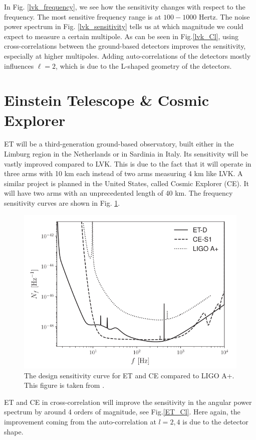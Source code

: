 In Fig. \ref{lvk_frequency}, we see how the sensitivity changes with respect to the frequency. The most sensitive frequency range is at $100 -1000$ Hertz.
The noise power spectrum in Fig. \ref{lvk_sensitivity} tells us at which magnitude we could expect to measure a certain multipole.
As can be seen in Fig.\ref{lvk_Cl}, using cross-correlations between the ground-based detectors improves the sensitivity, especially at higher multipoles. Adding auto-correlations of the detectors mostly influences $\ell=2$, which is due to the L-shaped geometry of the detectors. 

\section{Einstein Telescope \& Cosmic Explorer}

\label{ET_CE}

ET will be a third-generation ground-based observatory, built either in the Limburg region in the Netherlands or in Sardinia in Italy. Its sensitivity will be vastly improved compared to LVK. This is due to the fact that it will operate in three arms with 10 km each instead of two arms measuring 4 km like LVK. A similar project is planned in the United States, called Cosmic Explorer (CE). It will have two arms with an unprecedented length of 40 km. The frequency sensitivity curves are shown in Fig. \ref{ET_sensitivity}.

\begin{figure}[h]
    \centering
    \includegraphics[width=0.7\linewidth]{Images/ET_CE_frequency_noise.png}
    \caption[The design sensitivity curve for ET and CE compared to LIGO A+.]{The design sensitivity curve for ET and CE compared to LIGO A+. This figure is taken from \cite{alonso_noise_2020}.}
    \label{ET_sensitivity}
\end{figure} 

ET and CE in cross-correlation will improve the sensitivity in the angular power spectrum by around 4 orders of magnitude, see Fig.\ref{ET_Cl}.  Here again, the improvement coming from the auto-correlation at $l=2, 4$ is due to the detector shape.

